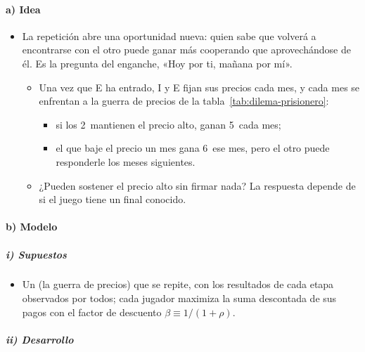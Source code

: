 \documentclass[11pt]{article}
\begin{document}
\paragraph{a) Idea}

\begin{itemize}
\item La repetición abre una oportunidad nueva: quien sabe que volverá a encontrarse con el otro puede ganar más cooperando que aprovechándose de él. Es la pregunta del enganche, «Hoy por ti, mañana por mí».
  \begin{itemize}
  \item Una vez que E ha entrado, \textup{I} y E fijan sus precios cada mes, y cada mes se enfrentan a la guerra de precios de la tabla~\ref{tab:dilema-prisionero}:
    \begin{itemize}
    \item si los 2~mantienen el precio alto, ganan 5~cada mes;
    \item el que baje el precio un mes gana 6~ese mes, pero el otro puede responderle los meses siguientes.
    \end{itemize}
  \item ¿Pueden sostener el precio alto sin firmar nada? La respuesta depende de si el juego tiene un final conocido.
  \end{itemize}
\end{itemize}

\paragraph{b) Modelo}

\subparagraph{i) Supuestos}

\begin{itemize}
\item Un  (la guerra de precios) que se repite, con los resultados de cada etapa observados por todos; cada jugador maximiza la suma descontada de sus pagos con el factor de descuento $\beta\equiv1/(1+\rho)$.
\end{itemize}

\subparagraph{ii) Desarrollo}
\end{document}
